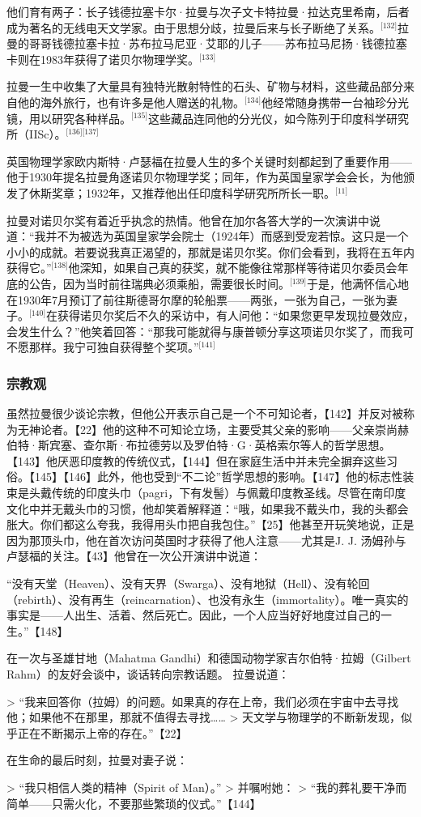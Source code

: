 他们育有两子：长子钱德拉塞卡尔·拉曼与次子文卡特拉曼·拉达克里希南，后者成为著名的无线电天文学家。由于思想分歧，拉曼后来与长子断绝了关系。\(^\text{[132]}\)拉曼的哥哥钱德拉塞卡拉·苏布拉马尼亚·艾耶的儿子——苏布拉马尼扬·钱德拉塞卡则在1983年获得了诺贝尔物理学奖。\(^\text{[133]}\)

拉曼一生中收集了大量具有独特光散射特性的石头、矿物与材料，这些藏品部分来自他的海外旅行，也有许多是他人赠送的礼物。\(^\text{[134]}\)他经常随身携带一台袖珍分光镜，用以研究各种样品。\(^\text{[135]}\)这些藏品连同他的分光仪，如今陈列于印度科学研究所（IISc）。\(^\text{[136][137]}\)

英国物理学家欧内斯特·卢瑟福在拉曼人生的多个关键时刻都起到了重要作用——他于1930年提名拉曼角逐诺贝尔物理学奖；同年，作为英国皇家学会会长，为他颁发了休斯奖章；1932年，又推荐他出任印度科学研究所所长一职。\(^\text{[11]}\)

拉曼对诺贝尔奖有着近乎执念的热情。他曾在加尔各答大学的一次演讲中说道：“我并不为被选为英国皇家学会院士（1924年）而感到受宠若惊。这只是一个小小的成就。若要说我真正渴望的，那就是诺贝尔奖。你们会看到，我将在五年内获得它。”\(^\text{[138]}\)他深知，如果自己真的获奖，就不能像往常那样等待诺贝尔委员会年底的公告，因为当时前往瑞典必须乘船，需要很长时间。\(^\text{[139]}\)于是，他满怀信心地在1930年7月预订了前往斯德哥尔摩的轮船票——两张，一张为自己，一张为妻子。\(^\text{[140]}\)在获得诺贝尔奖后不久的采访中，有人问他：“如果您更早发现拉曼效应，会发生什么？”他笑着回答：“那我可能就得与康普顿分享这项诺贝尔奖了，而我可不愿那样。我宁可独自获得整个奖项。”\(^\text{[141]}\)
\subsubsection{宗教观}
虽然拉曼很少谈论宗教，但他公开表示自己是一个不可知论者，【142】并反对被称为无神论者。【22】他的这种不可知论立场，主要受其父亲的影响——父亲崇尚赫伯特·斯宾塞、查尔斯·布拉德劳以及罗伯特·G·英格索尔等人的哲学思想。【143】他厌恶印度教的传统仪式，【144】但在家庭生活中并未完全摒弃这些习俗。【145】【146】此外，他也受到“不二论”哲学思想的影响。【147】他的标志性装束是头戴传统的印度头巾（pagri，下有发髻）与佩戴印度教圣线。尽管在南印度文化中并无戴头巾的习惯，他却笑着解释道：“哦，如果我不戴头巾，我的头都会胀大。你们都这么夸我，我得用头巾把自我包住。”【25】他甚至开玩笑地说，正是因为那顶头巾，他在首次访问英国时才获得了他人注意——尤其是J. J. 汤姆孙与卢瑟福的关注。【43】他曾在一次公开演讲中说道：

“没有天堂（Heaven）、没有天界（Swarga）、没有地狱（Hell）、没有轮回（rebirth）、没有再生（reincarnation）、也没有永生（immortality）。唯一真实的事实是——人出生、活着、然后死亡。因此，一个人应当好好地度过自己的一生。”【148】

在一次与圣雄甘地（Mahatma Gandhi）和德国动物学家吉尔伯特·拉姆（Gilbert Rahm）的友好会谈中，谈话转向宗教话题。
拉曼说道：

> “我来回答你（拉姆）的问题。如果真的存在上帝，我们必须在宇宙中去寻找他；如果他不在那里，那就不值得去寻找……
> 天文学与物理学的不断新发现，似乎正在不断揭示上帝的存在。”【22】

在生命的最后时刻，拉曼对妻子说：

> “我只相信人类的精神（Spirit of Man）。”
> 并嘱咐她：
> “我的葬礼要干净而简单——只需火化，不要那些繁琐的仪式。”【144】
